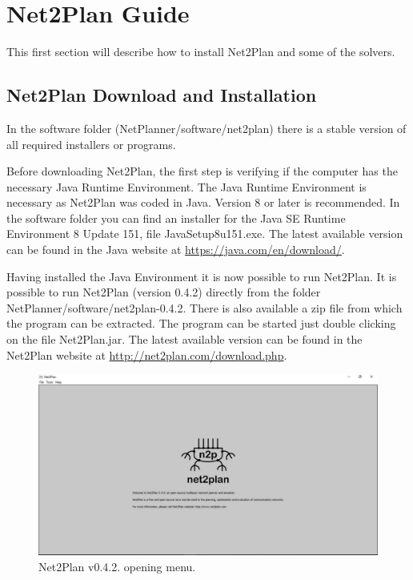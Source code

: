 \clearpage

\graphicspath{{./figures/}}
\section{Net2Plan Guide}
This first section will describe how to install Net2Plan and some of the solvers.


    \subsection*{Net2Plan Download and Installation}
    \vspace{0.5cm}
    
    In the software folder (NetPlanner/software/net2plan) there is a stable version of all required installers or programs.
    
	Before downloading Net2Plan, the first step is verifying if the computer has the necessary Java Runtime Environment.
    The Java Runtime Environment is necessary as Net2Plan was coded in Java.
    Version 8 or later is recommended.
    In the software folder you can find an installer for the Java SE Runtime Environment 8 Update 151, file JavaSetup8u151.exe. 
    The latest available version can be found in the Java website at \url{https://java.com/en/download/}.
		
    Having installed the Java Environment it is now possible to run Net2Plan.
    It is possible to run Net2Plan (version  0.4.2) directly from the folder NetPlanner/software/net2plan-0.4.2.
    There is also available a zip file from which the program can be extracted.
    The program can be started just double clicking on the file Net2Plan.jar.
    The latest available version can be found in the Net2Plan website at \url{http://net2plan.com/download.php}.

    \begin{figure}[h!]
       	\centering
       	\includegraphics[width = 13cm]{Net2Plan.pdf}
       	\caption{Net2Plan v0.4.2. opening menu.}
    \end{figure}

